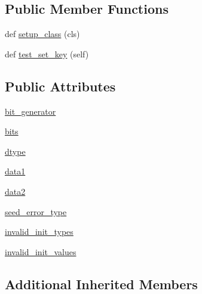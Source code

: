 \subsection*{Public Member Functions}
\begin{DoxyCompactItemize}
\item 
def \hyperlink{classnumpy_1_1random_1_1tests_1_1test__direct_1_1TestPhilox_affba850674108ae01369751e077aec2c}{setup\+\_\+class} (cls)
\item 
def \hyperlink{classnumpy_1_1random_1_1tests_1_1test__direct_1_1TestPhilox_ab194771d9e649ad28db85f34d0b27cf9}{test\+\_\+set\+\_\+key} (self)
\end{DoxyCompactItemize}
\subsection*{Public Attributes}
\begin{DoxyCompactItemize}
\item 
\hyperlink{classnumpy_1_1random_1_1tests_1_1test__direct_1_1TestPhilox_a338342da2a82bb4086df237f1ae21d97}{bit\+\_\+generator}
\item 
\hyperlink{classnumpy_1_1random_1_1tests_1_1test__direct_1_1TestPhilox_a155c22f11e362707bd1c5cb82ecbbf0f}{bits}
\item 
\hyperlink{classnumpy_1_1random_1_1tests_1_1test__direct_1_1TestPhilox_a92d47e6a424c5340c2ddf0dfcd8bc494}{dtype}
\item 
\hyperlink{classnumpy_1_1random_1_1tests_1_1test__direct_1_1TestPhilox_a494bea7583309de4fae5b7de936536b3}{data1}
\item 
\hyperlink{classnumpy_1_1random_1_1tests_1_1test__direct_1_1TestPhilox_aef95c7a5760a12fe3cb7364982827a84}{data2}
\item 
\hyperlink{classnumpy_1_1random_1_1tests_1_1test__direct_1_1TestPhilox_ab2690fbab756821706edffe8cd1cfd48}{seed\+\_\+error\+\_\+type}
\item 
\hyperlink{classnumpy_1_1random_1_1tests_1_1test__direct_1_1TestPhilox_a22468cc6dce12f87c13978b9c9e3dcf4}{invalid\+\_\+init\+\_\+types}
\item 
\hyperlink{classnumpy_1_1random_1_1tests_1_1test__direct_1_1TestPhilox_a9992126da14491c2dc069e2f05f001cf}{invalid\+\_\+init\+\_\+values}
\end{DoxyCompactItemize}
\subsection*{Additional Inherited Members}


